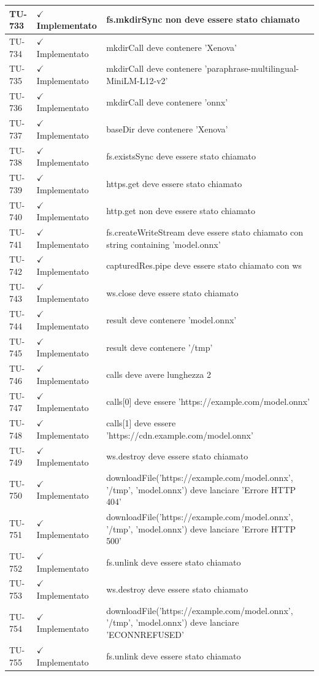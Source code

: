 ﻿\documentclass[a4paper,12pt]{article}
\newcommand{\ok}{\textcolor{green!60!black}{$\checkmark$ Implementato}}
\begin{document}
\begin{longtable}{|p{2cm}|p{3.5cm}|p{9.5cm}|}
\hline
TU-733 & \ok & fs.mkdirSync non deve essere stato chiamato \\
\hline
TU-734 & \ok & mkdirCall deve contenere 'Xenova' \\
\hline
TU-735 & \ok & mkdirCall deve contenere 'paraphrase-multilingual-MiniLM-L12-v2' \\
\hline
TU-736 & \ok & mkdirCall deve contenere 'onnx' \\
\hline
TU-737 & \ok & baseDir deve contenere 'Xenova' \\
\hline
TU-738 & \ok & fs.existsSync deve essere stato chiamato \\
\hline
TU-739 & \ok & https.get deve essere stato chiamato \\
\hline
TU-740 & \ok & http.get non deve essere stato chiamato \\
\hline
TU-741 & \ok & fs.createWriteStream deve essere stato chiamato con string containing 'model.onnx' \\
\hline
TU-742 & \ok & capturedRes.pipe deve essere stato chiamato con ws \\
\hline
TU-743 & \ok & ws.close deve essere stato chiamato \\
\hline
TU-744 & \ok & result deve contenere 'model.onnx' \\
\hline
TU-745 & \ok & result deve contenere '/tmp' \\
\hline
TU-746 & \ok & calls deve avere lunghezza 2 \\
\hline
TU-747 & \ok & calls[0] deve essere 'https://example.com/model.onnx' \\
\hline
TU-748 & \ok & calls[1] deve essere 'https://cdn.example.com/model.onnx' \\
\hline
TU-749 & \ok & ws.destroy deve essere stato chiamato \\
\hline
TU-750 & \ok & downloadFile('https://example.com/model.onnx', '/tmp', 'model.onnx') deve lanciare 'Errore HTTP 404' \\
\hline
TU-751 & \ok & downloadFile('https://example.com/model.onnx', '/tmp', 'model.onnx') deve lanciare 'Errore HTTP 500' \\
\hline
TU-752 & \ok & fs.unlink deve essere stato chiamato \\
\hline
TU-753 & \ok & ws.destroy deve essere stato chiamato \\
\hline
TU-754 & \ok & downloadFile('https://example.com/model.onnx', '/tmp', 'model.onnx') deve lanciare 'ECONNREFUSED' \\
\hline
TU-755 & \ok & fs.unlink deve essere stato chiamato \\

\end{longtable}
\end{document}
